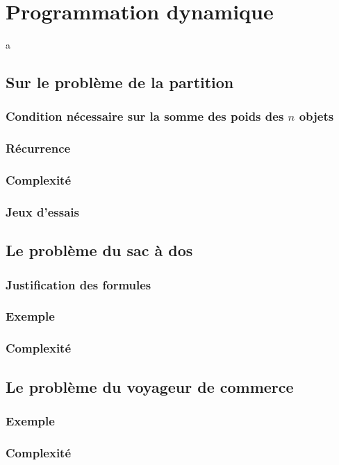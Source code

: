 
\section{Programmation dynamique}
a
\subsection{Sur le problème de la partition}
\subsubsection{Condition nécessaire sur la somme des poids des $n$ objets}

\subsubsection{Récurrence}

\subsubsection{Complexité}

\subsubsection{Jeux d'essais}


\subsection{Le problème du sac à dos}
\subsubsection{Justification des formules}

\subsubsection{Exemple}

\subsubsection{Complexité}


\subsection{Le problème du voyageur de commerce}
\subsubsection{Exemple}

\subsubsection{Complexité}
